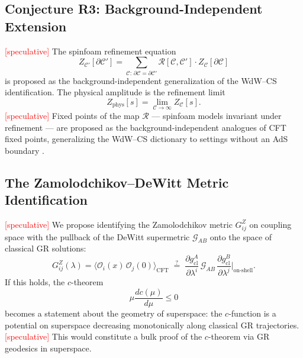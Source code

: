 \documentclass[11pt,a4paper]{article}
\begin{document}
\subsection{Conjecture R3: Background-Independent Extension}
\label{sec:R3}

\textcolor{red}{[speculative]} The spinfoam refinement equation \cite{ashtekar2004,thiemann1996}
\begin{equation}
  Z_{\mathcal{C}'}[\partial\mathcal{C}']
  = \sum_{\mathcal{C}:\,\partial\mathcal{C}=\partial\mathcal{C}'}
    \mathcal{R}[\mathcal{C},\mathcal{C}']\cdot Z_{\mathcal{C}}[\partial\mathcal{C}]
  \label{eq:9}
\end{equation}
is proposed as the background-independent generalization of the WdW--CS identification. The physical amplitude is the refinement limit
\begin{equation}
  Z_{\mathrm{phys}}[s] = \lim_{\mathcal{C}\to\infty} Z_{\mathcal{C}}[s].
  \label{eq:10}
\end{equation}
\textcolor{red}{[speculative]} Fixed points of the map $\mathcal{R}$ --- spinfoam models invariant under refinement --- are proposed as the background-independent analogues of CFT fixed points, generalizing the WdW--CS dictionary to settings without an AdS boundary \cite{ashtekar2004}.

\subsection{The Zamolodchikov--DeWitt Metric Identification}

\textcolor{red}{[speculative]} We propose identifying the Zamolodchikov metric $G^Z_{ij}$ on coupling space with the pullback of the DeWitt supermetric $\mathcal{G}_{AB}$ onto the space of classical GR solutions:
\begin{equation}
  G^Z_{ij}(\lambda)
  = \langle \mathcal{O}_i(x)\,\mathcal{O}_j(0)\rangle_{\mathrm{CFT}}
  \;\stackrel{?}{=}\;
  \frac{\partial g^A_{\mathrm{cl}}}{\partial\lambda^i}\,
  \mathcal{G}_{AB}\,
  \frac{\partial g^B_{\mathrm{cl}}}{\partial\lambda^j}\Bigg|_{\mathrm{on\text{-}shell}}.
  \label{eq:11}
\end{equation}
If this holds, the $c$-theorem
\begin{equation}
  \mu\frac{dc(\mu)}{d\mu} \leq 0
  \label{eq:12}
\end{equation}
becomes a statement about the geometry of superspace: the $c$-function is a potential on superspace decreasing monotonically along classical GR trajectories. \textcolor{red}{[speculative]} This would constitute a bulk proof of the $c$-theorem via GR geodesics in superspace.
\end{document}
